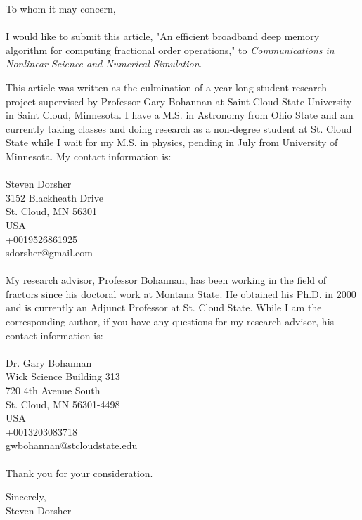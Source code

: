 \documentclass[12pt]{letter}
\begin{document}
\noindent To whom it may concern,
\\
\\
I would like to submit this article,  "An efficient broadband deep memory algorithm for computing fractional order operations," to {\em Communications in Nonlinear Science and Numerical Simulation}.

This article was written as the culmination of a year long student research project supervised by Professor Gary Bohannan at Saint Cloud State University in Saint Cloud, Minnesota. I have a M.S. in Astronomy from Ohio State and am currently taking classes and doing research as a non-degree student at St. Cloud State while I wait for my M.S. in physics, pending in July from University of Minnesota. My contact information is:
\\
\\
\noindent Steven Dorsher\\
3152 Blackheath Drive\\
St. Cloud, MN 56301\\
USA\\
+0019526861925\\
sdorsher@gmail.com\\
\\
My research advisor, Professor Bohannan, has been working in the field of fractors since his doctoral work at Montana State. He obtained his Ph.D. in 2000 and is currently an Adjunct Professor at St. Cloud State. While I am the corresponding author, if you have any questions for my research advisor, his contact information is:
\\
\\
\noindent Dr. Gary Bohannan\\
Wick Science Building 313\\
720 4th Avenue South\\
St. Cloud, MN 56301-4498\\
USA\\
+0013203083718\\
gwbohannan@stcloudstate.edu\\
\\
Thank you for your consideration. 

\noindent Sincerely,\\
Steven Dorsher
\end{document}
